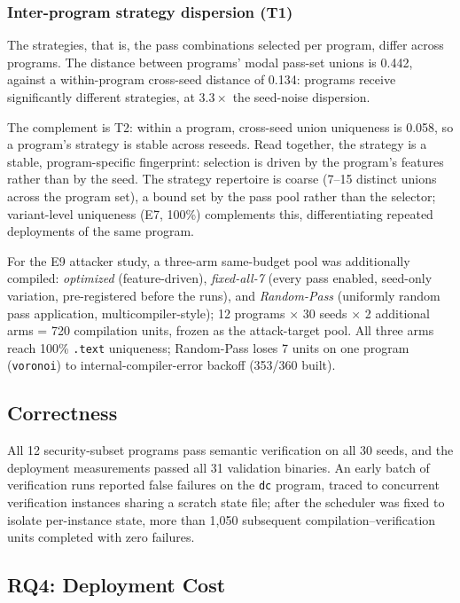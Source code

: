 \documentclass[5p,times,authoryear]{elsarticle}
\theoremstyle{plain}
\theoremstyle{definition}
\theoremstyle{remark}
\begin{document}
\subsubsection{Inter-program strategy dispersion (T1)}
The strategies, that is, the pass combinations selected per program, differ
across programs. The distance between programs' modal pass-set unions is 0.442,
against a within-program cross-seed distance of 0.134: programs receive
significantly different strategies, at $3.3\times$ the seed-noise dispersion.

The complement is T2: within a program, cross-seed union uniqueness is 0.058, so a
program's strategy is stable across reseeds. Read together, the strategy is a stable,
program-specific fingerprint: selection is driven by the program's features rather
than by the seed. The strategy repertoire is coarse (7--15 distinct unions across
the program set), a bound set by the pass pool rather than the selector; variant-level
uniqueness (E7, 100\%) complements this, differentiating repeated deployments of the
same program.

For the E9 attacker study, a three-arm same-budget pool was additionally compiled:
\emph{optimized} (feature-driven), \emph{fixed-all-7} (every pass enabled, seed-only
variation, pre-registered before the runs), and \emph{Random-Pass} (uniformly random
pass application, multicompiler-style); 12 programs $\times$ 30 seeds $\times$ 2
additional arms = 720 compilation units, frozen as the attack-target pool. All three
arms reach 100\% \texttt{.text} uniqueness; Random-Pass loses 7 units on one program
(\texttt{voronoi}) to internal-compiler-error backoff (353/360 built).

\subsection{Correctness}
\label{sec:correctness}

All 12 security-subset programs pass semantic verification on all 30 seeds, and
the deployment measurements passed all 31 validation binaries. An early batch of
verification runs reported false failures on the \texttt{dc} program, traced to
concurrent verification instances sharing a scratch state file; after the
scheduler was fixed to isolate per-instance state, more than 1{,}050 subsequent
compilation--verification units completed with zero failures.

\subsection{RQ4: Deployment Cost}
\end{document}
